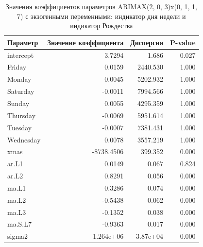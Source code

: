 \begin{table}%
    \caption{Значения коэффициентов параметров ARIMAX(2, 0, 3)x(0, 1, 1, 7) с экзогенными переменными: индикатор дня недели и индикатор Рождества}
    \centering
    \begin{tabular}{|l|r||r|r|}
        \hline
            Параметр           &     Значение коэффициента  &  Дисперсия  &  P-value \\
        \hline
            intercept          &     3.7294                 &     1.686 &   0.027 \\
            Friday             &     0.0159                 &  2440.530 &   1.000 \\
            Monday             &     0.0045                 &  5202.932 &   1.000 \\
            Saturday           &    -0.0011                 &  7994.566 &   1.000 \\
            Sunday             &     0.0055                 &  4295.359 &   1.000 \\
            Thursday           &    -0.0069                 &  5951.614 &   1.000 \\
            Tuesday            &    -0.0007                 &  7381.431 &   1.000 \\
            Wednesday          &     0.0078                 &  3557.219 &   1.000 \\
            xmas               & -8738.4506                 &   399.352 &   0.000 \\
            ar.L1              &     0.0149                 &     0.067 &   0.824 \\
            ar.L2              &     0.8291                 &     0.056 &   0.000 \\
            ma.L1              &     0.3286                 &     0.074 &   0.000 \\
            ma.L2              &    -0.5438                 &     0.062 &   0.000 \\
            ma.L3              &    -0.1352                 &     0.038 &   0.000 \\
            ma.S.L7            &    -0.9363                 &     0.017 &   0.000 \\
            sigma2             &  1.264e+06                 &  3.87e+04 &   0.000 \\
        \hline
    \end{tabular}
    \label{tbl:arimax_coeffs_exogen}
\end{table}


